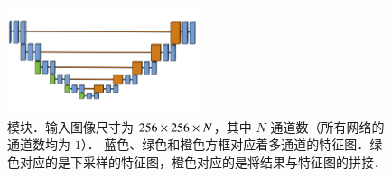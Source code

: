 \renewcommand{\captiontitle}{\UNet{} 模块}
\begin{figure}
\centering
\includegraphics[clip, trim=0 0 0 0,width=0.5\textwidth]{./data/unet-module.png}
\caption[\captiontitle]{\captiontitle{}．输入图像尺寸为 $256 \times 256 \times N$，其中 $N$ 通道数（所有网络的通道数均为 $1$）．
蓝色、绿色和橙色方框对应着多通道的特征图．绿色对应的是下采样的特征图，橙色对应的是将结果与特征图的拼接．}
\label{fig:unet-module}
\end{figure}

